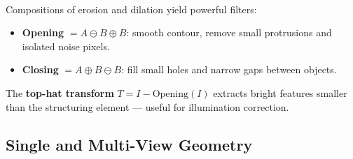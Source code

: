 \begin{tcbitemize}[ skin=sectionraster ]
    \tcbitem[title={Opening and Closing}, raster multicolumn=3]
    Compositions of erosion and dilation yield powerful filters\textsuperscript{\cite[][pp.~638--645]{gonzalezWoods2018}}:
    \begin{itemize}
        \item \textbf{Opening} $= A \ominus B \oplus B$: smooth contour, remove small protrusions and isolated noise pixels.
        \item \textbf{Closing} $= A \oplus B \ominus B$: fill small holes and narrow gaps between objects.
    \end{itemize}
    The \textbf{top-hat transform} $T = I - \mathrm{Opening}(I)$ extracts bright features smaller than the structuring element — useful for illumination correction.
\end{tcbitemize}

\subsection{Single and Multi-View Geometry}


